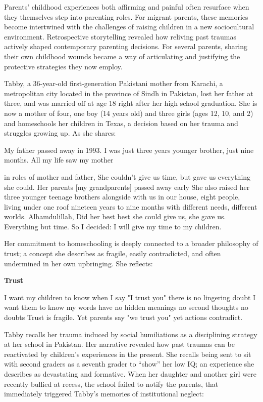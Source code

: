Parents’ childhood experiences both affirming and painful often resurface when they themselves step into parenting roles. For migrant parents, these memories become intertwined with the challenges of raising children in a new sociocultural environment. Retrospective storytelling revealed how reliving past traumas actively shaped contemporary parenting decisions. For several parents, sharing their own childhood wounds became a way of articulating and justifying the protective strategies they now employ.

Tabby, a 36-year-old first-generation Pakistani mother from Karachi, a metropolitan city located in the province of Sindh in Pakistan, lost her father at three, and was married off at age 18 right after her high school graduation. She is now a mother of four, one boy (14 years old) and three girls (ages 12, 10, and 2) and homeschools her children in Texas, a decision based on her trauma and struggles growing up. As she shares:

\begin{FoundPoem}
My father passed away in 1993.
I was just three years
younger brother, 
 just nine months.
All my life 
saw	  my mother

in roles of mother and father, 
She couldn’t give us time, 
but 				 gave us everything she could. 
Her parents [my grandparents] passed away early
She also raised her three younger teenage brothers
 alongside with us
in our house,
eight people,						 living under one roof
	nineteen years
 to
 nine months 
with
different needs,
different worlds.
Alhamdulillah,
Did her best 
 best she could give us,
she gave us.
 Everything but 
                             time.
So I decided:
 I will give my time to my children.
\end{FoundPoem}

Her commitment to homeschooling is deeply connected to a broader philosophy of trust; a concept she describes as fragile, easily contradicted, and often undermined in her own upbringing. She reflects:

\textbf{Trust}

\begin{FoundPoem}
I want my children to know
when I say "I trust you"
there is
 		no lingering doubt
I want them to know
my words have
 no hidden meanings
no second thoughts
no  doubts
Trust is fragile.
Yet parents say 
			"we trust you"
yet 		
actions contradict.

\end{FoundPoem}

Tabby recalls her trauma induced by social humiliations as a disciplining strategy at her school in Pakistan. Her narrative revealed how past traumas can be reactivated by children’s experiences in the present. She recalls being sent to sit with second graders as a seventh grader to ``show'' her low IQ; an experience she describes as devastating and formative. When her daughter and another girl were recently bullied at recess, the school failed to notify the parents, that immediately triggered Tabby’s memories of institutional neglect:

